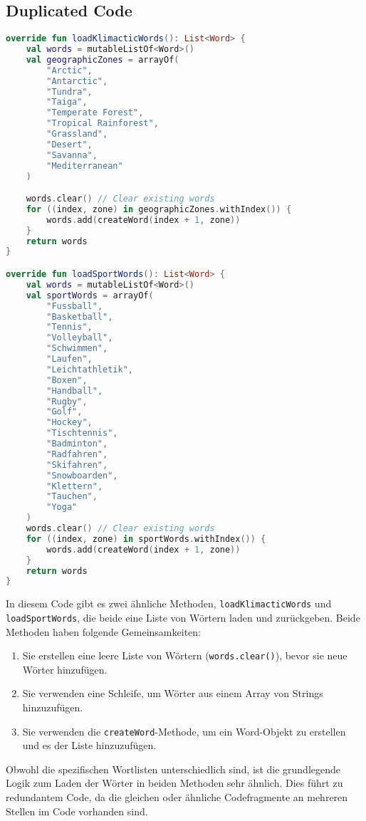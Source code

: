 \subsection*{Duplicated Code}
\begin{lstlisting}[language=Kotlin, caption={Code Smell: Duplicated Code}, label={lst:13}]
override fun loadKlimacticWords(): List<Word> {
    val words = mutableListOf<Word>()
    val geographicZones = arrayOf(
        "Arctic",
        "Antarctic",
        "Tundra",
        "Taiga",
        "Temperate Forest",
        "Tropical Rainforest",
        "Grassland",
        "Desert",
        "Savanna",
        "Mediterranean"
    )

    words.clear() // Clear existing words
    for ((index, zone) in geographicZones.withIndex()) {
        words.add(createWord(index + 1, zone))
    }
    return words
}

override fun loadSportWords(): List<Word> {
    val words = mutableListOf<Word>()
    val sportWords = arrayOf(
        "Fussball",
        "Basketball",
        "Tennis",
        "Volleyball",
        "Schwimmen",
        "Laufen",
        "Leichtathletik",
        "Boxen",
        "Handball",
        "Rugby",
        "Golf",
        "Hockey",
        "Tischtennis",
        "Badminton",
        "Radfahren",
        "Skifahren",
        "Snowboarden",
        "Klettern",
        "Tauchen",
        "Yoga"
    )
    words.clear() // Clear existing words
    for ((index, zone) in sportWords.withIndex()) {
        words.add(createWord(index + 1, zone))
    }
    return words
}
\end{lstlisting}
In diesem Code gibt es zwei ähnliche Methoden, \texttt{loadKlimacticWords} und \texttt{loadSportWords}, die beide eine Liste von Wörtern laden und zurückgeben. Beide Methoden haben folgende Gemeinsamkeiten:

\begin{enumerate}
  \item Sie erstellen eine leere Liste von Wörtern (\texttt{words.clear()}), bevor sie neue Wörter hinzufügen.
  \item Sie verwenden eine Schleife, um Wörter aus einem Array von Strings hinzuzufügen.
  \item Sie verwenden die \texttt{createWord}-Methode, um ein Word-Objekt zu erstellen und es der Liste hinzuzufügen.
\end{enumerate}

Obwohl die spezifischen Wortlisten unterschiedlich sind, ist die grundlegende Logik zum Laden der Wörter in beiden Methoden sehr ähnlich. Dies führt zu redundantem Code, da die gleichen oder ähnliche Codefragmente an mehreren Stellen im Code vorhanden sind.

